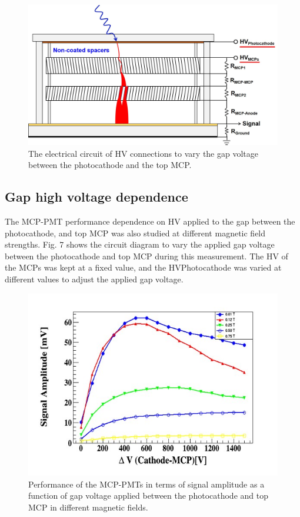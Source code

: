 \documentclass[preprint,5p]{elsarticle}
\begin{document}
\begin{figure}[tbp]
\centering \includegraphics[scale=0.32]{fig/Figure7.jpg}
\caption{The electrical circuit of HV connections to vary the gap voltage 
   between the photocathode and the top MCP.} \label{fig:design}
\end{figure}

\subsection{Gap high voltage dependence} \label{}
The MCP-PMT performance dependence on HV applied to the gap between the 
photocathode, and top MCP was also studied at different magnetic field 
strengths. Fig. 7 shows the circuit diagram to vary the applied gap voltage 
between the photocathode and top MCP during this measurement. The HV of the 
MCPs was kept at a fixed value, and the HVPhotocathode was varied at different 
values to adjust the applied gap voltage. 

\begin{figure}[tbp]
\centering \includegraphics[scale=0.6]{fig/Figure8.jpg}
\caption{Performance of the MCP-PMTs in terms of signal amplitude as a function 
   of gap voltage applied between the photocathode and top MCP in different 
   magnetic fields.} \label{fig:design}
\end{figure} 
\end{document}
